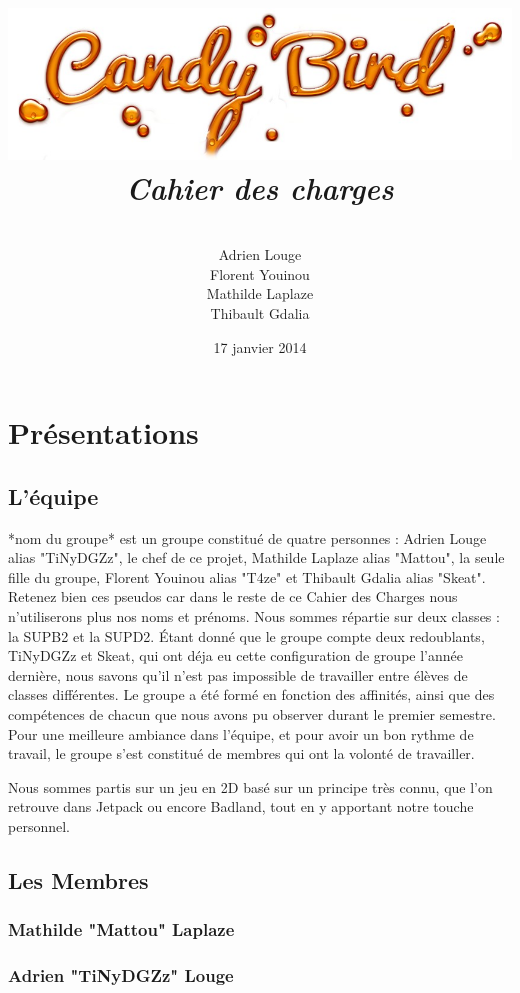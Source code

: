 \documentclass [11pt]{report}
\title{
	\includegraphics[scale=0.43]{images/entete.jpg}
	 \\\vspace{20mm}
	\textbf{\Huge \itshape Cahier des charges }
	}
\author{ \\\vspace{2mm}
	Adrien Louge \\\vspace{2mm}
	Florent Youinou\\\vspace{2mm}
	Mathilde Laplaze\\\vspace{2mm}
	Thibault Gdalia\\\vspace{30mm}
	}
\date{17 janvier 2014}
\begin{document}
\renewcommand{\baselinestretch}{0.001}
\maketitle
\tableofcontents

\newpage
\chapter {Pr\'esentations}

	\section{ L'\'equipe }

		*nom du groupe* est  un groupe constitué de quatre personnes : Adrien Louge alias "TiNyDGZz", le chef de ce projet, Mathilde Laplaze alias "Mattou", la seule fille du groupe, Florent Youinou alias "T4ze" et Thibault Gdalia alias "Skeat". Retenez bien ces pseudos car dans le reste de ce Cahier des Charges nous n'utiliserons plus nos noms et pr\'enoms. Nous sommes r\'epartie sur deux classes : la SUPB2 et la SUPD2.  \'Etant donné que le groupe compte deux redoublants, TiNyDGZz et Skeat, qui ont d\'eja eu cette configuration de groupe l'ann\'ee derni\`ere, nous savons qu'il n'est pas impossible de travailler entre \'el\`eves de classes diff\'erentes. Le groupe a \'et\'e form\'e en fonction des affinit\'es, ainsi que des comp\'etences de chacun que nous avons pu observer durant le premier semestre. Pour une meilleure ambiance dans l'\'equipe, et pour avoir un bon rythme de travail, le groupe s'est constitué de membres qui ont la volont\'e de travailler. 
	
	Nous sommes partis sur un jeu en 2D bas\'e sur un principe tr\`es connu, que l'on retrouve dans Jetpack ou encore Badland, tout en y apportant notre touche personnel.
	
	\newpage

	\section { Les Membres }
		\subsection {Mathilde "Mattou" Laplaze}
	
		
		\newpage

		\subsection {Adrien "TiNyDGZz" Louge}
	
\end{document}

